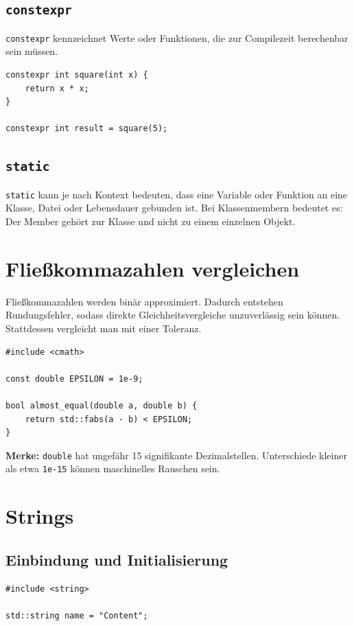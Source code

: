 \documentclass[11pt,a4paper]{article}
\newcommand{\code}[1]{\texttt{#1}}
\newcommand{\important}[1]{\textbf{#1}}
\begin{document}
\subsection{\code{constexpr}}
\code{constexpr} kennzeichnet Werte oder Funktionen, die zur Compilezeit berechenbar sein müssen.

\begin{lstlisting}[caption={Compilezeit-Konstante}]
constexpr int square(int x) {
    return x * x;
}

constexpr int result = square(5);
\end{lstlisting}

\subsection{\code{static}}
\code{static} kann je nach Kontext bedeuten, dass eine Variable oder Funktion an eine Klasse, Datei oder Lebensdauer gebunden ist. Bei Klassenmembern bedeutet es: Der Member gehört zur Klasse und nicht zu einem einzelnen Objekt.

\section{Fließkommazahlen vergleichen}

Fließkommazahlen werden binär approximiert. Dadurch entstehen Rundungsfehler, sodass direkte Gleichheitsvergleiche unzuverlässig sein können. Stattdessen vergleicht man mit einer Toleranz.

\begin{lstlisting}[caption={Vergleich mit Epsilon}]
#include <cmath>

const double EPSILON = 1e-9;

bool almost_equal(double a, double b) {
    return std::fabs(a - b) < EPSILON;
}
\end{lstlisting}

\important{Merke:} \code{double} hat ungefähr 15 signifikante Dezimalstellen. Unterschiede kleiner als etwa \code{1e-15} können maschinelles Rauschen sein.

\section{Strings}

\subsection{Einbindung und Initialisierung}
\begin{lstlisting}[caption={String initialisieren}]
#include <string>

std::string name = "Content";
\end{lstlisting}
\end{document}
